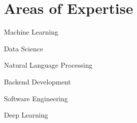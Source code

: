 \section{Areas of Expertise}
\begin{center}
    \begin{minipage}[t]{0.35\textwidth}
            \begin{zitemize}
                \item Machine Learning
                \item Data Science
            \end{zitemize}
    \end{minipage}%
    \begin{minipage}[t]{0.32\textwidth}
            \begin{zitemize}
                \item Natural Language Processing
                \item Backend Development
            \end{zitemize}
    \end{minipage}%
    \begin{minipage}[t]{0.3\textwidth}
            \begin{zitemize}
                \item Software Engineering
                \item Deep Learning
            \end{zitemize}
    \end{minipage}
\end{center}